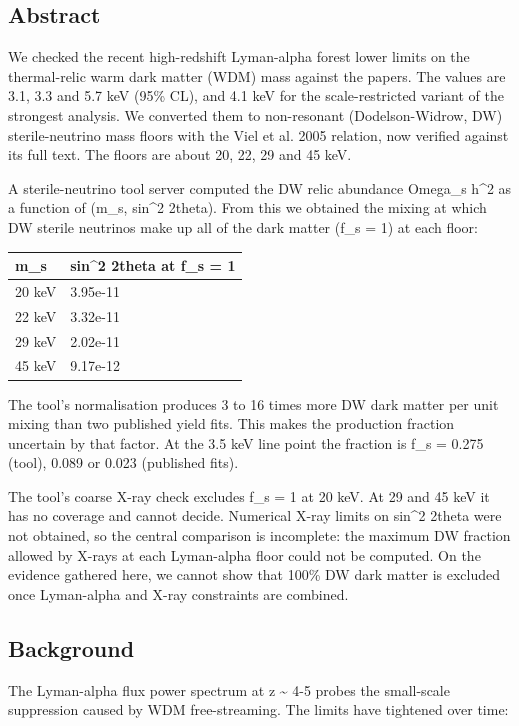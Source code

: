 \documentclass[11pt,a4paper]{article}
\begin{document}
\subsection{Abstract}
We checked the recent high-redshift Lyman-alpha forest lower limits on the thermal-relic warm dark matter (WDM) mass against the papers. The values are 3.1, 3.3 and 5.7 keV (95\% CL), and 4.1 keV for the scale-restricted variant of the strongest analysis. We converted them to non-resonant (Dodelson-Widrow, DW) sterile-neutrino mass floors with the Viel et al. 2005 relation, now verified against its full text. The floors are about 20, 22, 29 and 45 keV.

A sterile-neutrino tool server computed the DW relic abundance Omega\_s h\textasciicircum{}2 as a function of (m\_s, sin\textasciicircum{}2 2theta). From this we obtained the mixing at which DW sterile neutrinos make up all of the dark matter (f\_s = 1) at each floor:

\begin{longtable}{@{}p{}p{}@{}}
\toprule
\textbf{m\_s} & \textbf{sin\textasciicircum{}2 2theta at f\_s = 1} \\ \midrule \endhead
20 keV & 3.95e-11 \\
22 keV & 3.32e-11 \\
29 keV & 2.02e-11 \\
45 keV & 9.17e-12 \\
\bottomrule\end{longtable}
The tool's normalisation produces 3 to 16 times more DW dark matter per unit mixing than two published yield fits. This makes the production fraction uncertain by that factor. At the 3.5 keV line point the fraction is f\_s = 0.275 (tool), 0.089 or 0.023 (published fits).

The tool's coarse X-ray check excludes f\_s = 1 at 20 keV. At 29 and 45 keV it has no coverage and cannot decide. Numerical X-ray limits on sin\textasciicircum{}2 2theta were not obtained, so the central comparison is incomplete: the maximum DW fraction allowed by X-rays at each Lyman-alpha floor could not be computed. On the evidence gathered here, we cannot show that 100\% DW dark matter is excluded once Lyman-alpha and X-ray constraints are combined.

\subsection{Background}
The Lyman-alpha flux power spectrum at z \textasciitilde{} 4-5 probes the small-scale suppression caused by WDM free-streaming. The limits have tightened over time:
\end{document}
